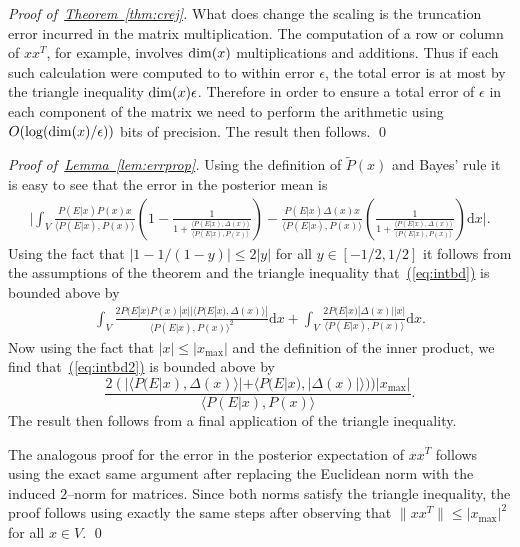 \documentclass[twoside]{article}
\newenvironment{proofof}[1]{\begin{trivlist}\item[]{\flushleft\it
Proof of~#1.}}
{\qed\end{trivlist}}
\newcommand{\eq}[1]{\hyperref[eq:#1]{(\ref*{eq:#1})}}
\newcommand{\thm}[1]{\hyperref[thm:#1]{Theorem~\ref*{thm:#1}}}
\newcommand{\lem}[1]{\hyperref[lem:#1]{Lemma~\ref*{lem:#1}}}
\begin{document}
\begin{proofof}{\thm{crej}}
What does change the scaling is the truncation error incurred in the matrix multiplication.  The computation of a row or column of $xx^T$, for example, involves ${\rm dim}(x)$ multiplications and additions.  Thus if each such calculation were computed to to within error $\epsilon$, the total error is at most by the triangle inequality ${\rm dim}(x) \epsilon$.  Therefore in order to ensure a total error of $\epsilon$ in each component of the matrix we need to perform the arithmetic using $O(\log({\rm dim}(x)/\epsilon))$ bits of precision.  The result then follows.
\end{proofof}

\begin{proofof}{\lem{errprop}}
Using the definition of $\tilde{P}(x)$ and Bayes' rule it is easy to see that the error in the posterior mean is
\begin{align}
\Biggr| \int_V \frac{P(E|x)P(x)x}{\langle P(E|x),P(x) \rangle}\left( 1 - \frac{1}{1+\frac{\langle P(E|x),\Delta(x)\rangle }{\langle P(E|x),P(x) \rangle}}\right) - \frac{P(E|x) \Delta(x)x}{\langle P(E|x),P(x)\rangle}\left(\frac{1}{1+\frac{\langle P(E|x),\Delta(x)\rangle }{\langle P(E|x),P(x) \rangle}} \right)\mathrm{d}x \Biggr|.\label{eq:intbd}
\end{align}
Using the fact that $|1-1/(1-y)| \le 2|y|$ for all $y\in [-1/2,1/2]$ it follows from the assumptions of the theorem and the triangle inequality that~\eq{intbd} is bounded above by
\begin{align}
 \int_V \frac{2P(E|x)P(x)|x| |\langle P(E|x),\Delta(x) \rangle|}{\langle P(E|x),P(x) \rangle^2}\mathrm{d}x+ \int_V\frac{2P(E|x) |\Delta(x)||x|}{\langle P(E|x),P(x)\rangle}\mathrm{d}x.\label{eq:intbd2}
\end{align}
Now using the fact that $|x|\le |x_{\max}|$ and the definition of the inner product, we find that~\eq{intbd2} is bounded above by
\begin{equation}
\frac{2 (|\langle P(E|x),\Delta(x) \rangle| + \langle P(E|x), |\Delta(x)| \rangle))|x_{\max}|}{\langle P(E|x),P(x)\rangle}.
\end{equation}
The  result then follows from a final application of the triangle inequality.

The analogous proof for the error in the posterior expectation of $xx^T$ follows using the exact same argument after replacing the Euclidean norm with the induced $2$--norm for matrices.  Since both norms satisfy the triangle inequality, the proof follows using exactly the same steps after observing that $\|xx^T\|\le |x_{\max}|^2$ for all $x\in V$.
\end{proofof}
\end{document}
